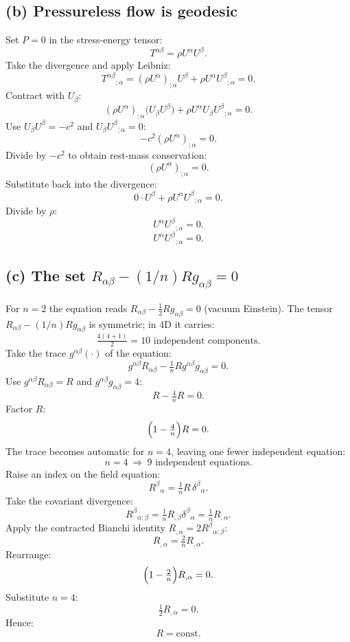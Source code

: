 \documentclass[11pt]{article}
\begin{document}
\subsection*{(b) Pressureless flow is geodesic}

Set $P=0$ in the stress-energy tensor:
\[
T^{\alpha\beta}=\rho U^\alpha U^\beta.
\]
Take the divergence and apply Leibniz:
\[
T^{\alpha\beta}{}_{;\alpha}=(\rho U^\alpha)_{;\alpha}U^\beta+\rho U^\alpha U^\beta{}_{;\alpha}=0.
\]
Contract with $U_\beta$:
\[
(\rho U^\alpha)_{;\alpha}\bigl(U_\beta U^\beta\bigr)+\rho U^\alpha U_\beta U^\beta{}_{;\alpha}=0.
\]
Use $U_\beta U^\beta=-c^2$ and $U_\beta U^\beta{}_{;\alpha}=0$:
\[
-c^2(\rho U^\alpha)_{;\alpha}=0.
\]
Divide by $-c^2$ to obtain rest-mass conservation:
\[
(\rho U^\alpha)_{;\alpha}=0.
\]
Substitute back into the divergence:
\[
0\cdot U^\beta+\rho U^\alpha U^\beta{}_{;\alpha}=0.
\]
Divide by $\rho$:
\[
U^\alpha U^\beta{}_{;\alpha}=0.
\]
\begin{equation}
\boxed{\ U^\alpha U^\beta{}_{;\alpha}=0.\ }
\label{eq:geodesic}
\end{equation}

\subsection*{(c) The set $R_{\alpha\beta}-(1/n)Rg_{\alpha\beta}=0$}

For $n=2$ the equation reads $R_{\alpha\beta}-\tfrac12 Rg_{\alpha\beta}=0$ (vacuum Einstein). The tensor $R_{\alpha\beta}-(1/n)Rg_{\alpha\beta}$ is symmetric; in 4D it carries:
\[
\tfrac{4(4+1)}{2}=10\text{ independent components}.
\]
Take the trace $g^{\alpha\beta}(\cdot)$ of the equation:
\[
g^{\alpha\beta}R_{\alpha\beta}-\tfrac{1}{n}Rg^{\alpha\beta}g_{\alpha\beta}=0.
\]
Use $g^{\alpha\beta}R_{\alpha\beta}=R$ and $g^{\alpha\beta}g_{\alpha\beta}=4$:
\[
R-\tfrac{4}{n}R=0.
\]
Factor $R$:
\[
\Bigl(1-\tfrac{4}{n}\Bigr)R=0.
\]
The trace becomes automatic for $n=4$, leaving one fewer independent equation:
\begin{equation}
\boxed{\ n=4\ \Rightarrow\ 9\text{ independent equations.}\ }
\label{eq:nfour}
\end{equation}
Raise an index on the field equation:
\[
R^\beta{}_{\alpha}=\tfrac{1}{n}R\,\delta^\beta{}_{\alpha}.
\]
Take the covariant divergence:
\[
R^\beta{}_{\alpha;\beta}=\tfrac{1}{n}R_{,\beta}\delta^\beta{}_\alpha=\tfrac{1}{n}R_{,\alpha}.
\]
Apply the contracted Bianchi identity $R_{,\alpha}=2R^\beta{}_{\alpha;\beta}$:
\[
R_{,\alpha}=\tfrac{2}{n}R_{,\alpha}.
\]
Rearrange:
\[
\Bigl(1-\tfrac{2}{n}\Bigr)R_{,\alpha}=0.
\]
Substitute $n=4$:
\[
\tfrac12 R_{,\alpha}=0.
\]
Hence:
\[
\boxed{\ R=\text{const.}\ }
\]
\end{document}
